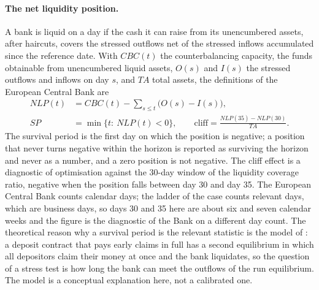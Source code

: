 \paragraph{The net liquidity position.}
A bank is liquid on a day if the cash it can raise from its unencumbered assets, after haircuts, covers the stressed outflows net of the stressed inflows accumulated since the reference date. With $CBC(t)$ the counterbalancing capacity, the funds obtainable from unencumbered liquid assets, $O(s)$ and $I(s)$ the stressed outflows and inflows on day $s$, and $TA$ total assets, the definitions of the European Central Bank are \citep{alm:ecb2019note,alm:ecb2019annex}
\begin{align}
NLP(t)&=CBC(t)-\sum_{s\le t}\big(O(s)-I(s)\big),\label{eq:alm-nlp}\\
SP&=\min\{t:\ NLP(t)<0\},\qquad \text{cliff}=\frac{NLP(35)-NLP(30)}{TA}.\label{eq:alm-sp}
\end{align}
The survival period is the first day on which the position is negative; a position that never turns negative within the horizon is reported as surviving the horizon and never as a number, and a zero position is not negative. The cliff effect is a diagnostic of optimisation against the 30-day window of the liquidity coverage ratio, negative when the position falls between day 30 and day 35. The European Central Bank counts calendar days; the ladder of the case counts relevant days, which are business days, so days 30 and 35 here are about six and seven calendar weeks and the figure is the diagnostic of the Bank on a different day count. The theoretical reason why a survival period is the relevant statistic is the model of \citet{ccr:diamond1983}: a deposit contract that pays early claims in full has a second equilibrium in which all depositors claim their money at once and the bank liquidates, so the question of a stress test is how long the bank can meet the outflows of the run equilibrium. The model is a conceptual explanation here, not a calibrated one.

